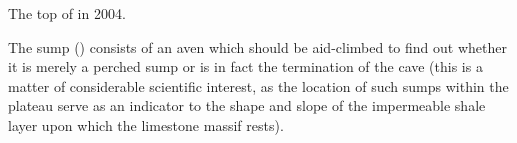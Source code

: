 \begin{marginfigure}
\caption{The top of  in 2004. }
\end{marginfigure}

The sump () consists of an aven which should be aid-climbed to find out whether it is merely a perched sump or is in fact the  termination of the cave (this is a matter of considerable scientific interest, as the location of such sumps within the  plateau serve as an indicator to the shape and slope of the impermeable shale layer upon which the limestone massif rests).

